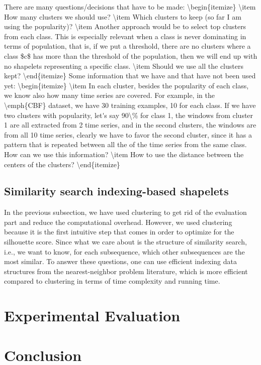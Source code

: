 \documentclass[sigconf, nonacm]{acmart}
\begin{document}
\ac{
	There are many questions/decisions that have to be made:
	\begin{itemize}
		\item How many clusters we should use?
		\item Which clusters to keep (so far I am using the popularity)?
    \item Another approach would be to select top clusters from each class. This
      is especially relevant when a class is never dominating in terms of 
      population, that is, if we put a threshold, there are no clusters
      where a class $c$ has more than the threshold of the population, then we
      will end up with no shapelets representing a specific class.
		\item Should we use all the clusters kept?
	\end{itemize}
	Some information that we have and that have not been used yet:
	\begin{itemize}
		\item In each cluster, besides the popularity of each class, we know also
		      how many time series are covered. For example, in the \emph{CBF}
		      dataset, we have 30 training examples, 10 for each class. If we have
		      two clusters with popularity, let's say 90\% for class 1, the windows
		      from cluster 1 are all extracted from 2 time series, and in the second
		      clusters, the windows are from all 10 time series, clearly we have to
		      favor the second cluster, since it has a pattern that is repeated
		      between all the of the time series from the same class. How can we
		      use this information?
		\item How to use the distance between the centers of the clusters?
	\end{itemize}
}

\subsection{Similarity search indexing-based shapelets}
In the previous subsection, we have used clustering to get rid of the evaluation
part and reduce the computational overhead. However, we used clustering because
it is the first intuitive step that comes in order to optimize for the 
silhouette score.
Since what we care about is the structure of similarity search, i.e., we want to
know, for each subsequence, which other subsequences are the most similar. To
answer these questions, one can use efficient indexing data structures from the
nearest-neighbor problem literature, which is more efficient compared to 
clustering in terms of time complexity and running time.

\section{Experimental Evaluation}

\section{Conclusion}




\end{document}
